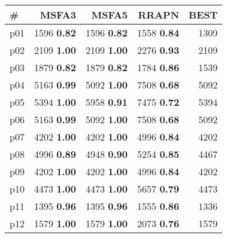 \begin{tabular}{lrrrr}
\toprule
\textbf{\#} & \textbf{MSFA3} & \textbf{MSFA5} & \textbf{RRAPN} & \textbf{BEST}\\
\midrule
\multicolumn{1}{l|}{p01} & {\footnotesize 1596} \textbf{0.82} & {\footnotesize 1596} \textbf{0.82} & {\footnotesize 1558} \textbf{0.84} & \multicolumn{1}{|r}{1309}\\
\multicolumn{1}{l|}{p02} & {\footnotesize 2109} \textbf{1.00} & {\footnotesize 2109} \textbf{1.00} & {\footnotesize 2276} \textbf{0.93} & \multicolumn{1}{|r}{2109}\\
\multicolumn{1}{l|}{p03} & {\footnotesize 1879} \textbf{0.82} & {\footnotesize 1879} \textbf{0.82} & {\footnotesize 1784} \textbf{0.86} & \multicolumn{1}{|r}{1539}\\
\multicolumn{1}{l|}{p04} & {\footnotesize 5163} \textbf{0.99} & {\footnotesize 5092} \textbf{1.00} & {\footnotesize 7508} \textbf{0.68} & \multicolumn{1}{|r}{5092}\\
\multicolumn{1}{l|}{p05} & {\footnotesize 5394} \textbf{1.00} & {\footnotesize 5958} \textbf{0.91} & {\footnotesize 7475} \textbf{0.72} & \multicolumn{1}{|r}{5394}\\
\multicolumn{1}{l|}{p06} & {\footnotesize 5163} \textbf{0.99} & {\footnotesize 5092} \textbf{1.00} & {\footnotesize 7508} \textbf{0.68} & \multicolumn{1}{|r}{5092}\\
\multicolumn{1}{l|}{p07} & {\footnotesize 4202} \textbf{1.00} & {\footnotesize 4202} \textbf{1.00} & {\footnotesize 4996} \textbf{0.84} & \multicolumn{1}{|r}{4202}\\
\multicolumn{1}{l|}{p08} & {\footnotesize 4996} \textbf{0.89} & {\footnotesize 4948} \textbf{0.90} & {\footnotesize 5254} \textbf{0.85} & \multicolumn{1}{|r}{4467}\\
\multicolumn{1}{l|}{p09} & {\footnotesize 4202} \textbf{1.00} & {\footnotesize 4202} \textbf{1.00} & {\footnotesize 4996} \textbf{0.84} & \multicolumn{1}{|r}{4202}\\
\multicolumn{1}{l|}{p10} & {\footnotesize 4473} \textbf{1.00} & {\footnotesize 4473} \textbf{1.00} & {\footnotesize 5657} \textbf{0.79} & \multicolumn{1}{|r}{4473}\\
\multicolumn{1}{l|}{p11} & {\footnotesize 1395} \textbf{0.96} & {\footnotesize 1395} \textbf{0.96} & {\footnotesize 1555} \textbf{0.86} & \multicolumn{1}{|r}{1336}\\
\multicolumn{1}{l|}{p12} & {\footnotesize 1579} \textbf{1.00} & {\footnotesize 1579} \textbf{1.00} & {\footnotesize 2073} \textbf{0.76} & \multicolumn{1}{|r}{1579}\\

\end{tabular}
